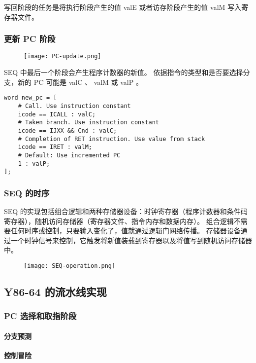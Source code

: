 写回阶段的任务是将执行阶段产生的值 valE 或者访存阶段产生的值 valM 写入寄存器文件。

\subsubsection{更新 PC 阶段}
\begin{figure}[H]
    \centering
    \texttt{[image: PC-update.png]}
\end{figure}

SEQ 中最后一个阶段会产生程序计数器的新值。
依据指令的类型和是否要选择分支，新的 PC 可能是 valC 、 valM 或 valP 。
\begin{lstlisting}[style=CStyle]
word new_pc = [
    # Call. Use instruction constant
    icode == ICALL : valC;
    # Taken branch. Use instruction constant
    icode == IJXX && Cnd : valC;
    # Completion of RET instruction. Use value from stack
    icode == IRET : valM;
    # Default: Use incremented PC
    1 : valP;
];
\end{lstlisting}

\subsubsection{SEQ 的时序}

SEQ 的实现包括组合逻辑和两种存储器设备：时钟寄存器（程序计数器和条件码寄存器），随机访问存储器（寄存器文件、指令内存和数据内存）。
组合逻辑不需要任何时序或控制，只要输入变化了，值就通过逻辑门网络传播。
存储器设备通过一个时钟信号来控制，它触发将新值装载到寄存器以及将值写到随机访问存储器中。

\begin{figure}[H]
    \centering
    \texttt{[image: SEQ-operation.png]}
\end{figure}

\subsection{Y86-64 的流水线实现}

\subsubsection{PC 选择和取指阶段}
\paragraph{分支预测}
\paragraph{控制冒险}
